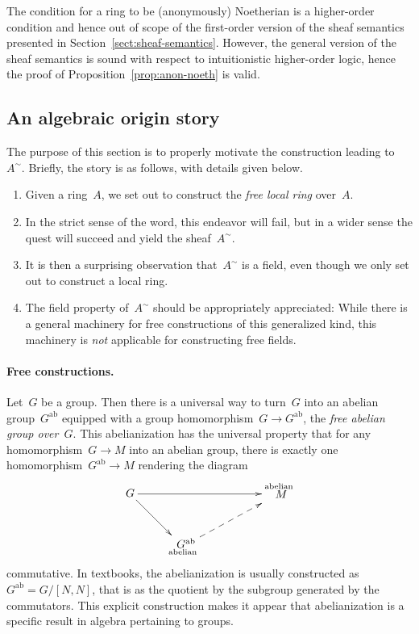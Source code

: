 \documentclass{ws-rv9x6}
\newcommand{\ab}{\mathrm{ab}}
\renewcommand{\_}{\mathpunct{.}}
\newcommand{\?}{\,{:}\,}
\begin{document}
\begin{remark}The condition for a ring to be (anonymously) Noetherian is a
higher-order condition and hence out of scope of the first-order version of the
sheaf semantics presented in Section~\ref{sect:sheaf-semantics}. However, the
general version of the sheaf semantics is sound with respect to intuitionistic
higher-order logic, hence the proof of Proposition~\ref{prop:anon-noeth} is
valid.
\end{remark}


\subsection{An algebraic origin story}
\label{sect:origins}

The purpose of this section is to properly motivate the construction
leading to~$A^\sim$. Briefly, the story is as follows, with details given
below.
\begin{enumerate}
\item Given a ring~$A$, we set out to construct the \emph{free local ring}
over~$A$.
\item In the strict sense of the word, this endeavor will fail, but in a wider
sense the quest will succeed and yield the sheaf~$A^\sim$.
\item It is then a surprising observation that~$A^\sim$ is a field, even though
we only set out to construct a local ring.
\item The field property of~$A^\sim$ should be appropriately appreciated: While
there is a general machinery for free constructions of this generalized kind, this
machinery is \emph{not} applicable for constructing free fields.
\end{enumerate}

\paragraph{Free constructions.}
Let~$G$ be a group. Then there is a universal way to turn~$G$ into an abelian
group~$G^\ab$ equipped with a group homomorphism~$G \to G^\ab$, the \emph{free
abelian group over~$G$}. This abelianization has the universal property that
for any homomorphism~$G \to M$ into an abelian group, there is exactly one
homomorphism~$G^\ab \to M$ rendering the diagram
\[ \xymatrix{
  G \ar[rd] \ar[rrr] &&& {\substack{\text{abelian}\\\text{\normalsize$\!M$}\\\phantom{\text{abelian}}}} \\
  & {\substack{\text{\normalsize$G^\ab$}\\\text{abelian}}} \ar@{-->}_[@!29]{}[rru]
} \]
commutative. In textbooks, the abelianization is usually constructed as~$G^\ab
= G/[N,N]$, that is as the quotient by the subgroup generated by the
commutators. This explicit construction makes it appear that abelianization
is a specific result in algebra pertaining to groups.
\end{document}
